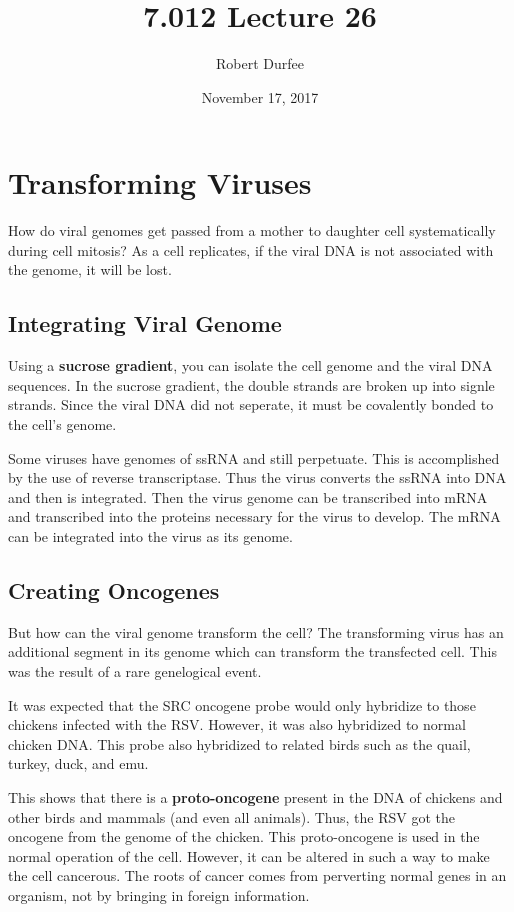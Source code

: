 \documentclass{article}
\title{ 7.012 Lecture 26 }
\author{ Robert Durfee }
\date{ November 17, 2017 }
\begin{document}
\maketitle

\section{ Transforming Viruses }

How do viral genomes get passed from a mother to daughter cell systematically
during cell mitosis? As a cell replicates, if the viral DNA is not associated
with the genome, it will be lost.

\subsection{Integrating Viral Genome}

Using a \textbf{sucrose gradient}, you can isolate the cell genome and the viral
DNA sequences. In the sucrose gradient, the double strands are broken up into
signle strands. Since the viral DNA did not seperate, it must be covalently
bonded to the cell's genome. 

Some viruses have genomes of ssRNA and still perpetuate. This is accomplished by
the use of reverse transcriptase. Thus the virus converts the ssRNA into DNA and
then is integrated. Then the virus genome can be transcribed into mRNA and
transcribed into the proteins necessary for the virus to develop. The mRNA can
be integrated into the virus as its genome.

\subsection{Creating Oncogenes}

But how can the viral genome transform the cell? The transforming virus has an
additional segment in its genome which can transform the transfected cell. This
was the result of a rare genelogical event.

It was expected that the SRC oncogene probe would only hybridize to those
chickens infected with the RSV. However, it was also hybridized to normal
chicken DNA.  This probe also hybridized to related birds such as the quail,
turkey, duck, and emu.

This shows that there is a \textbf{proto-oncogene} present in the DNA of
chickens and other birds and mammals (and even all animals). Thus, the RSV got
the oncogene from the genome of the chicken. This proto-oncogene is used in the
normal operation of the cell. However, it can be altered in such a way to make
the cell cancerous. The roots of cancer comes from perverting normal genes in an
organism, not by bringing in foreign information. 
\end{document}
